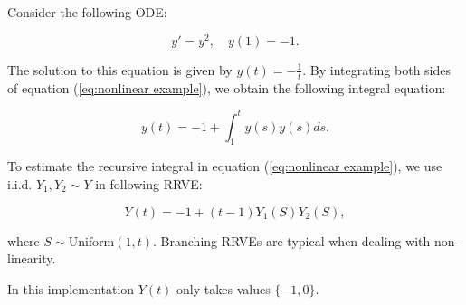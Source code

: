 \documentclass[a4paper,12pt]{article}
\begin{document}
\begin{example}[$y'=y^{2}$] \label{ex:nonlinear example}
    Consider the following ODE:

    \begin{equation} \label{eq:nonlinear example}
        y' = y^2, \quad y(1) = -1.
    \end{equation}

    The solution to this equation is given by $y(t) = -\frac{1}{t}$.
    By integrating both sides of equation (\ref{eq:nonlinear example}),
    we obtain the following integral equation:

    \begin{equation}
        y(t) = -1 + \int_{1}^{t} y(s) y(s)ds.
    \end{equation}

    To estimate the recursive integral in equation (\ref{eq:nonlinear example}),
    we use i.i.d. $Y_1,Y_2 \sim Y$ in following RRVE:

    \begin{equation} \label{RRVE: nonlinear example}
        Y(t) = -1 + (t-1) Y_1(S) Y_2(S),
    \end{equation}

    where $S \sim \text{Uniform}(1,t)$.
    Branching RRVEs are typical when dealing
    with non-linearity.
\end{example}

\vspace*{0.2cm}
\begin{pythonn}\label{py:nonlinear example}
    In this implementation $Y(t)$ only takes values $\{-1,0\}$.
\end{pythonn}
\end{document}
